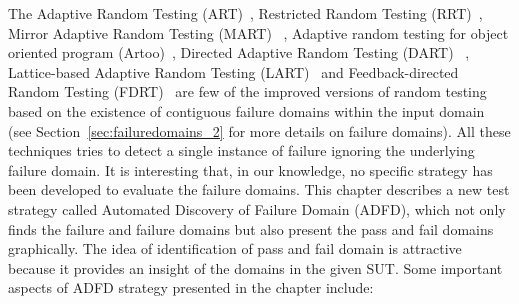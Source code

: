 





The Adaptive Random Testing (ART)~\cite{chen2005adaptive}, Restricted Random Testing (RRT)~\cite{chan2006restricted}, Mirror Adaptive Random Testing (MART) ~\cite{chen2004mirror}, Adaptive random testing for object oriented program (Artoo)~\cite{ciupa2008artoo}, Directed Adaptive Random Testing (DART) ~\cite{godefroid2005dart}, Lattice-based Adaptive Random Testing (LART)~\cite{mayer2005lattice} and Feedback-directed Random Testing (FDRT)~\cite{pacheco2007randoop, pacheco2007feedback} are few of the improved versions of random testing based on the existence of contiguous failure domains within the input domain (see Section~\ref{sec:failuredomains_2} for more details on failure domains). All these techniques tries to detect a single instance of failure ignoring the underlying failure domain. It is interesting that, in our knowledge, no specific strategy has been developed to evaluate the failure domains. This chapter describes a new test strategy called Automated Discovery of Failure Domain (ADFD), which not only finds the failure and failure domains but also present the pass and fail domains graphically. The idea of identification of pass and fail domain is attractive because it provides an insight of the domains in the given SUT. Some important aspects of ADFD strategy presented in the chapter include:


